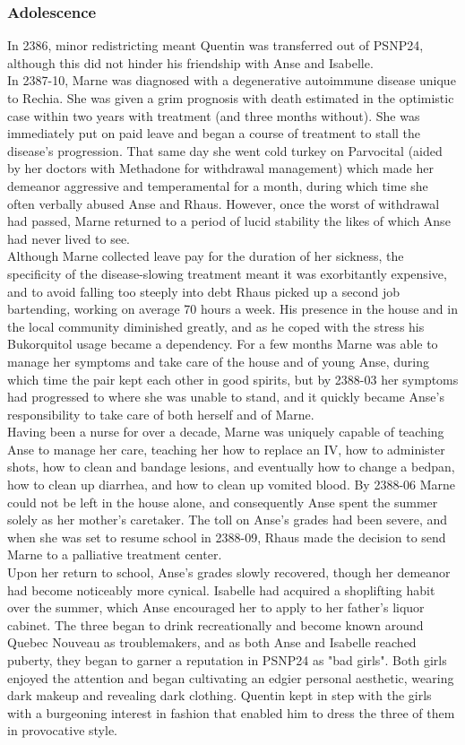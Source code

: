\documentclass[12pt,a4paper,twocolumn]{article}
\begin{document}
	\subsubsection{Adolescence}
	\indent In 2386, minor redistricting meant Quentin was transferred out of PSNP24, although this did not hinder his friendship with Anse and Isabelle.\\
	\indent In 2387-10, Marne was diagnosed with a degenerative autoimmune disease unique to Rechia. She was given a grim prognosis with death estimated in the optimistic case within two years with treatment (and three months without). She was immediately put on paid leave and began a course of treatment to stall the disease's progression. That same day she went cold turkey on Parvocital (aided by her doctors with Methadone for withdrawal management) which made her demeanor aggressive and temperamental for a month, during which time she often verbally abused Anse and Rhaus. However, once the worst of withdrawal had passed, Marne returned to a period of lucid stability the likes of which Anse had never lived to see.\\
	\indent Although Marne collected leave pay for the duration of her sickness, the specificity of the disease-slowing treatment meant it was exorbitantly expensive, and to avoid falling too steeply into debt Rhaus picked up a second job bartending, working on average 70 hours a week. His presence in the house and in the local community diminished greatly, and as he coped with the stress his Bukorquitol usage became a dependency. For a few months Marne was able to manage her symptoms and take care of the house and of young Anse, during which time the pair kept each other in good spirits, but by 2388-03 her symptoms had progressed to where she was unable to stand, and it quickly became Anse's responsibility to take care of both herself and of Marne.\\
	\indent Having been a nurse for over a decade, Marne was uniquely capable of teaching Anse to manage her care, teaching her how to replace an IV, how to administer shots, how to clean and bandage lesions, and eventually how to change a bedpan, how to clean up diarrhea, and how to clean up vomited blood. By 2388-06 Marne could not be left in the house alone, and consequently Anse spent the summer solely as her mother's caretaker. The toll on Anse's grades had been severe, and when she was set to resume school in 2388-09, Rhaus made the decision to send Marne to a palliative treatment center.\\
	\indent Upon her return to school, Anse's grades slowly recovered, though her demeanor had become noticeably more cynical. Isabelle had acquired a shoplifting habit over the summer, which Anse encouraged her to apply to her father's liquor cabinet. The three began to drink recreationally and become known around Quebec Nouveau as troublemakers, and as both Anse and Isabelle reached puberty, they began to garner a reputation in PSNP24 as "bad girls". Both girls enjoyed the attention and began cultivating an edgier personal aesthetic, wearing dark makeup and revealing dark clothing. Quentin kept in step with the girls with a burgeoning interest in fashion that enabled him to dress the three of them in provocative style.\\
\end{document}
